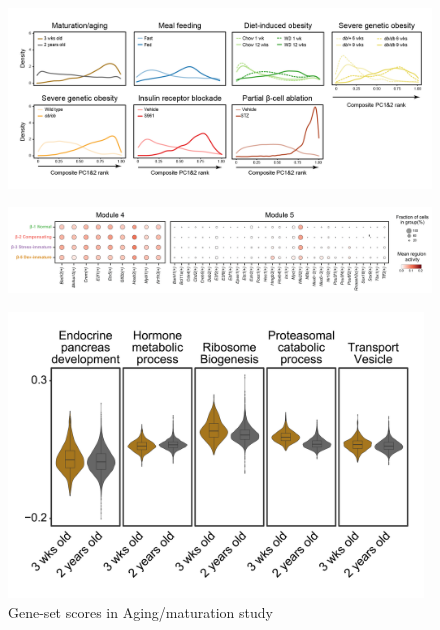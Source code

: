 \begin{figure}[H]
\centering
\includegraphics[width=\linewidth]{Appendix2/Fig/F3-7-01.png}
\caption[β-cell failure across studies along composite PC1 and PC2]{}
\label{suppl_fig:chp3_pc2}
\end{figure}

\begin{figure}[H]
\centering
\includegraphics[width=\linewidth]{Appendix2/Fig/F3-12-04.png}
\caption[Mean regulon activity of all regulons in Module-4 and Module-5 of β-cell GRN]{}
\label{suppl_fig:chp3_GRNmods45}
\end{figure}


\begin{figure}[t]
\centering
\includegraphics[width=11cm]{Appendix2/Fig/F3-14-01.png}
\caption[]{Gene-set scores in Aging/maturation study}
\label{suppl_fig:chp3_agingscores}
\end{figure}




